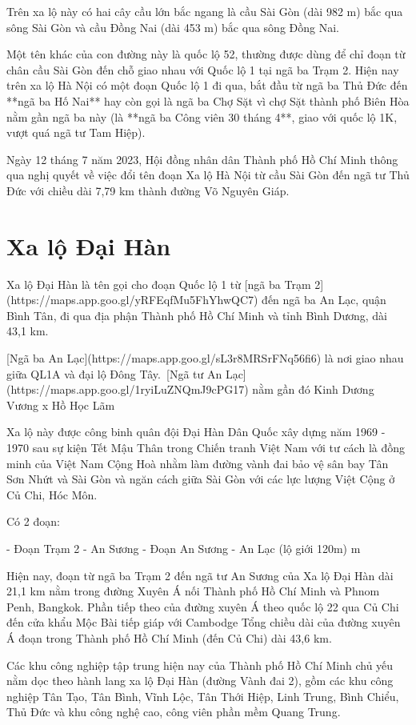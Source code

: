 Trên xa lộ này có hai cây cầu lớn bắc ngang là cầu Sài Gòn (dài 982 m) bắc qua sông Sài Gòn và cầu Đồng Nai (dài 453 m) bắc qua sông Đồng Nai.

Một tên khác của con đường này là quốc lộ 52, thường được dùng để chỉ đoạn từ chân cầu Sài Gòn đến chỗ giao nhau với Quốc lộ 1 tại ngã ba Trạm 2. Hiện nay trên xa lộ Hà Nội có một đoạn Quốc lộ 1 đi qua, bắt đầu từ ngã ba Thủ Đức đến **ngã ba Hố Nai** hay còn gọi là ngã ba Chợ Sặt vì chợ Sặt thành phố Biên Hòa nằm gần ngã ba này (là **ngã ba Công viên 30 tháng 4**, giao với quốc lộ 1K, vượt quá ngã tư Tam Hiệp).

Ngày 12 tháng 7 năm 2023, Hội đồng nhân dân Thành phố Hồ Chí Minh thông qua nghị quyết về việc đổi tên đoạn Xa lộ Hà Nội từ cầu Sài Gòn đến ngã tư Thủ Đức với chiều dài 7,79 km thành đường Võ Nguyên Giáp.

\section{Xa lộ Đại Hàn}

Xa lộ Đại Hàn là tên gọi cho đoạn Quốc lộ 1 từ [ngã ba Trạm 2](https://maps.app.goo.gl/yRFEqfMu5FhYhwQC7) đến ngã ba An Lạc, quận Bình Tân, đi qua địa phận Thành phố Hồ Chí Minh và tỉnh Bình Dương, dài 43,1 km.

[Ngã ba An Lạc](https://maps.app.goo.gl/sL3r8MRSrFNq56fi6) là nơi giao nhau giữa QL1A và đại lộ Đông Tây.\
[Ngã tư An Lạc](https://maps.app.goo.gl/1ryiLuZNQmJ9cPG17) nằm gần đó Kinh Dương Vương x Hồ Học Lãm

Xa lộ này được công binh quân đội Đại Hàn Dân Quốc xây dựng năm 1969 - 1970 sau sự kiện Tết Mậu Thân trong Chiến tranh Việt Nam với tư cách là đồng minh của Việt Nam Cộng Hoà nhằm làm đường vành đai bảo vệ sân bay Tân Sơn Nhứt và Sài Gòn và ngăn cách giữa Sài Gòn với các lực lượng Việt Cộng ở Củ Chi, Hóc Môn.

Có 2 đoạn:

- Đoạn Trạm 2 - An Sương
- Đoạn An Sương - An Lạc (lộ giới 120m) m

Hiện nay, đoạn từ ngã ba Trạm 2 đến ngã tư An Sương của Xa lộ Đại Hàn dài 21,1 km nằm trong đường Xuyên Á nối Thành phố Hồ Chí Minh và Phnom Penh, Bangkok. Phần tiếp theo của đường xuyên Á theo quốc lộ 22 qua Củ Chi đến cửa khẩu Mộc Bài tiếp giáp với Cambodge Tổng chiều dài của đường xuyên Á đoạn trong Thành phố Hồ Chí Minh (đến Củ Chi) dài 43,6 km.

Các khu công nghiệp tập trung hiện nay của Thành phố Hồ Chí Minh chủ yếu nằm dọc theo hành lang xa lộ Đại Hàn (đường Vành đai 2), gồm các khu công nghiệp Tân Tạo, Tân Bình, Vĩnh Lộc, Tân Thới Hiệp, Linh Trung, Bình Chiểu, Thủ Đức và khu công nghệ cao, công viên phần mềm Quang Trung.

